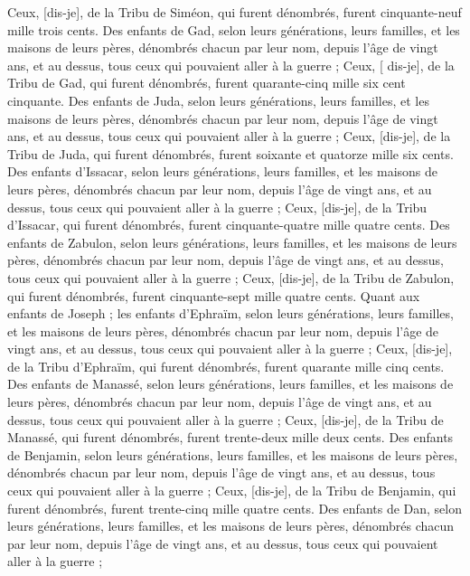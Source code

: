 \begin{multicols}{2}
Ceux, [dis-je], de la Tribu de Siméon, qui furent dénombrés, furent cinquante-neuf mille trois cents.
Des enfants de Gad, selon leurs générations, leurs familles, et les maisons de leurs pères, dénombrés chacun par leur nom, depuis l'âge de vingt ans, et au dessus, tous ceux qui pouvaient aller à la guerre ;
Ceux, [ dis-je], de la Tribu de Gad, qui furent dénombrés, furent quarante-cinq mille six cent cinquante.
Des enfants de Juda, selon leurs générations, leurs familles, et les maisons de leurs pères, dénombrés chacun par leur nom, depuis l'âge de vingt ans, et au dessus, tous ceux qui pouvaient aller à la guerre ;
Ceux, [dis-je], de la Tribu de Juda, qui furent dénombrés, furent soixante et quatorze mille six cents.
Des enfants d'Issacar, selon leurs générations, leurs familles, et les maisons de leurs pères, dénombrés chacun par leur nom, depuis l'âge de vingt ans, et au dessus, tous ceux qui pouvaient aller à la guerre ;
Ceux, [dis-je], de la Tribu d'Issacar, qui furent dénombrés, furent cinquante-quatre mille quatre cents.
Des enfants de Zabulon, selon leurs générations, leurs familles, et les maisons de leurs pères, dénombrés chacun par leur nom, depuis l'âge de vingt ans, et au dessus, tous ceux qui pouvaient aller à la guerre ;
Ceux, [dis-je], de la Tribu de Zabulon, qui furent dénombrés, furent cinquante-sept mille quatre cents.
Quant aux enfants de Joseph ; les enfants d'Ephraïm, selon leurs générations, leurs familles, et les maisons de leurs pères, dénombrés chacun par leur nom, depuis l'âge de vingt ans, et au dessus, tous ceux qui pouvaient aller à la guerre ;
Ceux, [dis-je], de la Tribu d'Ephraïm, qui furent dénombrés, furent quarante mille cinq cents.
Des enfants de Manassé, selon leurs générations, leurs familles, et les maisons de leurs pères, dénombrés chacun par leur nom, depuis l'âge de vingt ans, et au dessus, tous ceux qui pouvaient aller à la guerre ;
Ceux, [dis-je], de la Tribu de Manassé, qui furent dénombrés, furent trente-deux mille deux cents.
Des enfants de Benjamin, selon leurs générations, leurs familles, et les maisons de leurs pères, dénombrés chacun par leur nom, depuis l'âge de vingt ans, et au dessus, tous ceux qui pouvaient aller à la guerre ;
Ceux, [dis-je], de la Tribu de Benjamin, qui furent dénombrés, furent trente-cinq mille quatre cents.
Des enfants de Dan, selon leurs générations, leurs familles, et les maisons de leurs pères, dénombrés chacun par leur nom, depuis l'âge de vingt ans, et au dessus, tous ceux qui pouvaient aller à la guerre ;

\end{multicols}

